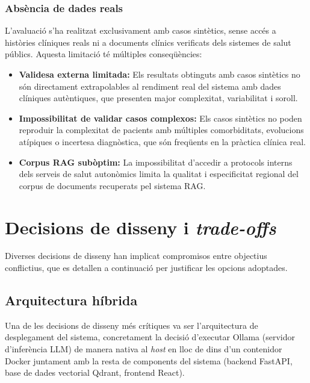 \documentclass[CAT]{TFUOC}%
\begin{document}
\subsubsection{Absència de dades reals}

L'avaluació s'ha realitzat exclusivament amb casos sintètics, sense accés a històries clíniques reals ni a documents clínics verificats dels sistemes de salut públics. Aquesta limitació té múltiples conseqüències:

\begin{itemize}
    \item \textbf{Validesa externa limitada:} Els resultats obtinguts amb casos sintètics no són directament extrapolables al rendiment real del sistema amb dades clíniques autèntiques, que presenten major complexitat, variabilitat i soroll.
    
    \item \textbf{Impossibilitat de validar casos complexos:} Els casos sintètics no poden reproduir la complexitat de pacients amb múltiples comorbiditats, evolucions atípiques o incertesa diagnòstica, que són freqüents en la pràctica clínica real.
    
    \item \textbf{Corpus RAG subòptim:} La impossibilitat d'accedir a protocols interns dels serveis de salut autonòmics limita la qualitat i especificitat regional del corpus de documents recuperats pel sistema RAG.
\end{itemize}

\section{Decisions de disseny i \textit{trade-offs}}

Diverses decisions de disseny han implicat compromisos entre objectius conflictius, que es detallen a continuació per justificar les opcions adoptades.

\subsection{Arquitectura híbrida}

Una de les decisions de disseny més crítiques va ser l'arquitectura de desplegament del sistema, concretament la decisió d'executar Ollama (servidor d'inferència LLM) de manera nativa al \textit{host} en lloc de dins d'un contenidor Docker juntament amb la resta de components del sistema (backend FastAPI, base de dades vectorial Qdrant, frontend React).
\end{document}
